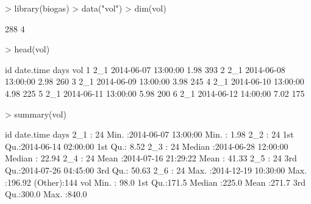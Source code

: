 \documentclass{article}
\begin{document}
\begin{Schunk}
\begin{Sinput}
> library(biogas)
> data("vol")
> dim(vol)
\end{Sinput}
\begin{Soutput}
[1] 288   4
\end{Soutput}
\begin{Sinput}
> head(vol)
\end{Sinput}
\begin{Soutput}
   id           date.time days vol
1 2_1 2014-06-07 13:00:00 1.98 393
2 2_1 2014-06-08 13:00:00 2.98 260
3 2_1 2014-06-09 13:00:00 3.98 245
4 2_1 2014-06-10 13:00:00 4.98 225
5 2_1 2014-06-11 13:00:00 5.98 200
6 2_1 2014-06-12 14:00:00 7.02 175
\end{Soutput}
\begin{Sinput}
> summary(vol)
\end{Sinput}
\begin{Soutput}
       id        date.time                        days       
 2_1    : 24   Min.   :2014-06-07 13:00:00   Min.   :  1.98  
 2_2    : 24   1st Qu.:2014-06-14 02:00:00   1st Qu.:  8.52  
 2_3    : 24   Median :2014-06-28 12:00:00   Median : 22.94  
 2_4    : 24   Mean   :2014-07-16 21:29:22   Mean   : 41.33  
 2_5    : 24   3rd Qu.:2014-07-26 04:45:00   3rd Qu.: 50.63  
 2_6    : 24   Max.   :2014-12-19 10:30:00   Max.   :196.92  
 (Other):144                                                 
      vol       
 Min.   : 98.0  
 1st Qu.:171.5  
 Median :225.0  
 Mean   :271.7  
 3rd Qu.:300.0  
 Max.   :840.0  
\end{Soutput}
\end{Schunk}
\end{document}
